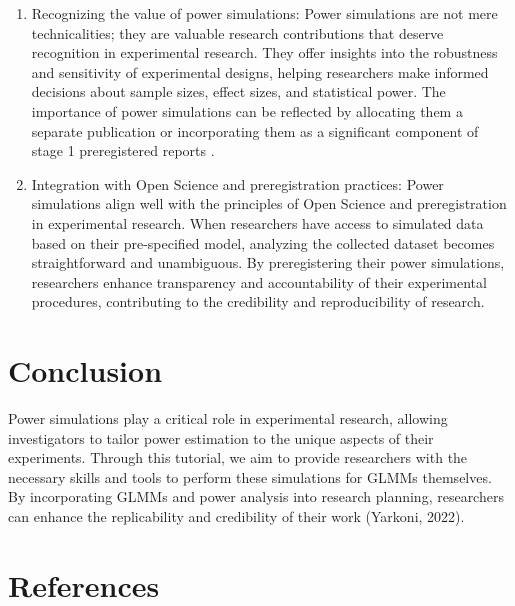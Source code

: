 \documentclass[
  man,floatsintext]{apa6}
\begin{document}
\begin{enumerate}
\item
  Recognizing the value of power simulations: Power simulations are not mere technicalities; they are valuable research contributions that deserve recognition in experimental research. They offer insights into the robustness and sensitivity of experimental designs, helping researchers make informed decisions about sample sizes, effect sizes, and statistical power. The importance of power simulations can be reflected by allocating them a separate publication or incorporating them as a significant component of stage 1 preregistered reports .
\item
  Integration with Open Science and preregistration practices: Power simulations align well with the principles of Open Science and preregistration in experimental research. When researchers have access to simulated data based on their pre-specified model, analyzing the collected dataset becomes straightforward and unambiguous. By preregistering their power simulations, researchers enhance transparency and accountability of their experimental procedures, contributing to the credibility and reproducibility of research.
\end{enumerate}

\hypertarget{conclusion}{%
\section{Conclusion}\label{conclusion}}

Power simulations play a critical role in experimental research, allowing investigators to tailor power estimation to the unique aspects of their experiments. Through this tutorial, we aim to provide researchers with the necessary skills and tools to perform these simulations for GLMMs themselves. By incorporating GLMMs and power analysis into research planning, researchers can enhance the replicability and credibility of their work (Yarkoni, 2022).

\newpage

\hypertarget{references}{%
\section{References}\label{references}}
\end{document}
